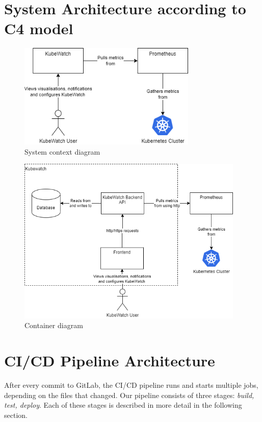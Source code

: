 \section{System Architecture according to C4 model}
\begin{figure}[H]
  \centering
  \includegraphics[height=5cm]{resources/System_context_diagram.png}
  \caption{System context diagram}
  \label{fig:system-context-diagram}
\end{figure}

\begin{figure}[H]
  \centering
  \includegraphics[height=8cm]{resources/Container_diagram.png}
  \caption{Container diagram}
  \label{fig:container-diagram}
\end{figure}

\pagebreak
\section{CI/CD Pipeline Architecture}
After every commit to GitLab, the CI/CD pipeline runs and starts multiple jobs, depending on the files that changed.
Our pipeline consists of three stages: \textit{build, test, deploy}. Each of these stages is described in more detail in the following section.

